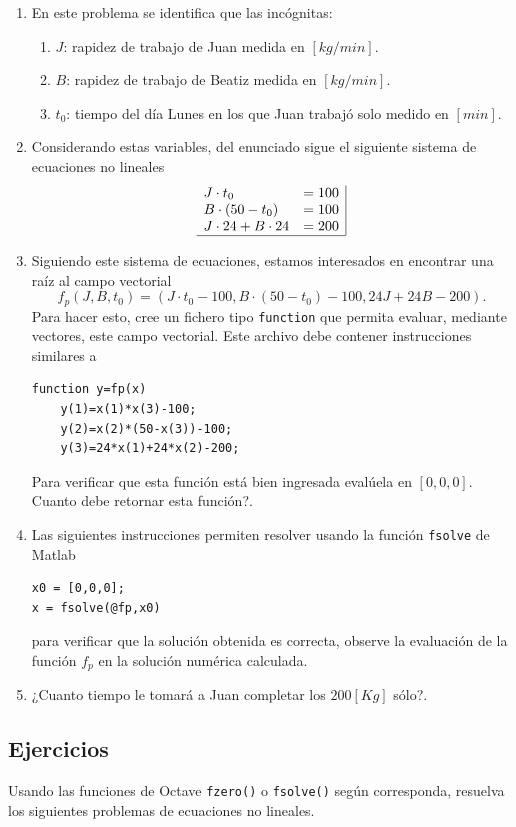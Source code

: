 \documentclass[letter,11pt]{article}
\newcommand\0{\mathbf{0}}
\newcommand{\matlab}{{\sc Matlab} }
\newcommand{\octave}{{\sc Octave} }
\begin{document}
\begin{enumerate}
\begin{enumerate}
\item En este problema se identifica que las inc\'ognitas:
\begin{enumerate}
\item $J$: rapidez de trabajo de Juan medida en $[kg/min]$.
\item $B$: rapidez de trabajo de Beatiz medida en $[kg/min]$.
\item $t_0$:  tiempo del d\'ia Lunes en los que Juan trabaj\'o solo medido en $[min]$.
\end{enumerate}
\item Considerando estas variables, del enunciado sigue el siguiente sistema de ecuaciones no lineales
$$
\begin{array}{lr|}
J\cdot t_0	&=100\\
B\cdot(50-t_0)	&=100\\
J\cdot 24 + B\cdot 24 &=200\\
\hline
\end{array}
$$
\item Siguiendo este sistema de ecuaciones, estamos interesados en encontrar una ra\'iz al campo vectorial
$$
f_p(J,B,t_0)=(J\cdot t_0-100, B\cdot(50-t_0)-100, 24J+24B-200).
$$
Para hacer esto, cree un fichero tipo \texttt{function} que permita evaluar, mediante vectores, este campo vectorial. Este archivo debe contener instrucciones similares a
\begin{lstlisting}
function y=fp(x)
	y(1)=x(1)*x(3)-100;
	y(2)=x(2)*(50-x(3))-100;
	y(3)=24*x(1)+24*x(2)-200;
\end{lstlisting}
Para verificar que esta funci\'on est\'a bien ingresada eval\'uela en $[0,0,0]$. \textquestiondown Cuanto debe retornar esta funci\'on?.

\item Las siguientes instrucciones permiten resolver usando la funci\'on \texttt{fsolve} de  \matlab
\begin{lstlisting}
x0 = [0,0,0];
x = fsolve(@fp,x0)
\end{lstlisting}
para verificar que la soluci\'on obtenida es correcta, observe la evaluaci\'on de la funci\'on $f_p$ en la soluci\'on num\'erica calculada.
\item ¿Cuanto tiempo le tomar\'a a Juan completar los $200[Kg]$ s\'olo?.
\end{enumerate}

\end{enumerate}
	
\subsection{Ejercicios}
Usando las funciones  de \octave \texttt{fzero()} o \texttt{fsolve()} seg\'un corresponda, resuelva los siguientes problemas de ecuaciones no lineales.
\end{document}
